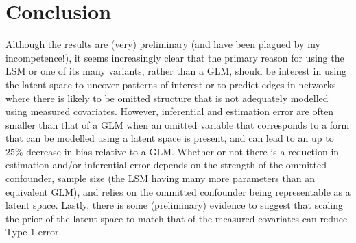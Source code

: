 \documentclass[12pt]{article}
\begin{document}
\section{Conclusion}

Although the results are (very) preliminary (and have been plagued by my incompetence!), it seems increasingly clear that the primary reason for using the LSM or one of its many variants, rather than a GLM, should be interest in using the latent space to uncover patterns of interest or to predict edges in networks where there is likely to be omitted structure that is not adequately modelled using measured covariates. However, inferential and estimation error are often smaller than that of a GLM when an omitted variable that corresponds to a form that can be modelled using a latent space is present, and can lead to an up to $25\%$ decrease in bias relative to a GLM. Whether or not there is a reduction in estimation and/or inferential error depends on the strength of the ommitted confounder, sample size (the LSM having many more parameters than an equivalent GLM), and relies on the ommitted confounder being representable as a latent space. Lastly, there is some (preliminary) evidence to suggest that scaling the prior of the latent space to match that of the measured covariates can reduce Type-1 error.

\newpage



\end{document}
